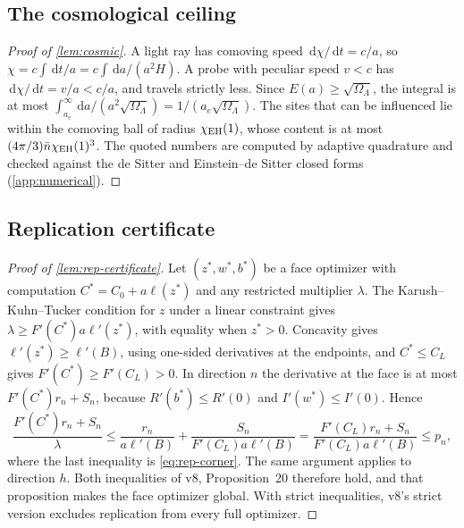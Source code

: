 \documentclass[11pt,a4paper]{article}
\theoremstyle{definition}
\newcommand{\dd}{\,\mathrm{d}}
\begin{document}
\subsection{The cosmological ceiling}
\label{app:cosmic-proof}
\begin{proof}[Proof of \cref{lem:cosmic}]
A light ray has comoving speed $\dd\chi/\dd t=c/a$, so
$\chi=c\int\dd t/a=c\int\dd a/(a^2H)$. A probe with peculiar speed $v<c$ has
$\dd\chi/\dd t=v/a<c/a$, and travels strictly less. Since
$E(a)\geq\sqrt{\Omega_\Lambda}$, the integral is at most
$\int_{a_e}^\infty\dd a/(a^2\sqrt{\Omega_\Lambda})=1/(a_e\sqrt{\Omega_\Lambda})$.
The sites that can be influenced lie within the comoving ball of radius
$\chi_{\rm EH}(1)$, whose content is at most $(4\pi/3)\bar n\chi_{\rm EH}(1)^3$.
The quoted numbers are computed by adaptive quadrature and checked against the
de Sitter and Einstein--de Sitter closed forms (\cref{app:numerical}).
\end{proof}

\subsection{Replication certificate}
\label{app:rep-proof}
\begin{proof}[Proof of \cref{lem:rep-certificate}]
Let $(z^*,w^*,b^*)$ be a face optimizer with computation
$C^*=C_0+a\ell(z^*)$ and any restricted multiplier $\lambda$. The
Karush--Kuhn--Tucker condition for $z$ under a linear constraint gives
$\lambda\geq F'(C^*)a\ell'(z^*)$, with equality when $z^*>0$. Concavity gives
$\ell'(z^*)\geq\ell'(B)$, using one-sided derivatives at the endpoints, and
$C^*\leq C_L$ gives $F'(C^*)\geq F'(C_L)>0$. In direction $n$ the derivative at
the face is at most $F'(C^*)r_n+S_n$, because $R'(b^*)\leq R'(0)$ and
$I'(w^*)\leq I'(0)$. Hence
\[
 \frac{F'(C^*)r_n+S_n}{\lambda}\leq\frac{r_n}{a\ell'(B)}
 +\frac{S_n}{F'(C_L)a\ell'(B)}=\frac{F'(C_L)r_n+S_n}{F'(C_L)a\ell'(B)}\leq p_n,
\]
where the last inequality is \cref{eq:rep-corner}. The same argument applies to
direction $h$. Both inequalities of v8, Proposition~20 therefore hold, and that
proposition makes the face optimizer global. With strict inequalities, v8's
strict version excludes replication from every full optimizer.
\end{proof}
\end{document}
